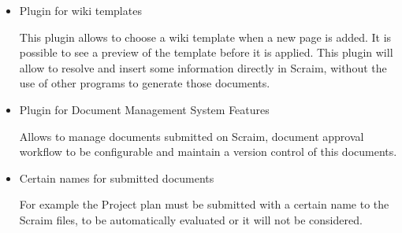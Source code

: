 \begin{itemize}
	\item Plugin for wiki templates \citep{wikitemplates}
	
	This plugin allows to choose a wiki template when a new page is added. It is possible to see a preview of the template before it is applied.
	This plugin will allow to resolve and insert some information directly in Scraim, without the use of other programs to generate those documents.
	
	\item Plugin for Document Management System Features \citep{DMSF}
	
	Allows to manage documents submitted on Scraim, document approval workflow to be configurable and maintain a version control of this documents.
	
	\item Certain names for submitted documents
	
	For example the Project plan must be submitted with a certain name to the Scraim files, to be automatically evaluated or it will not be considered.
	
\end{itemize}